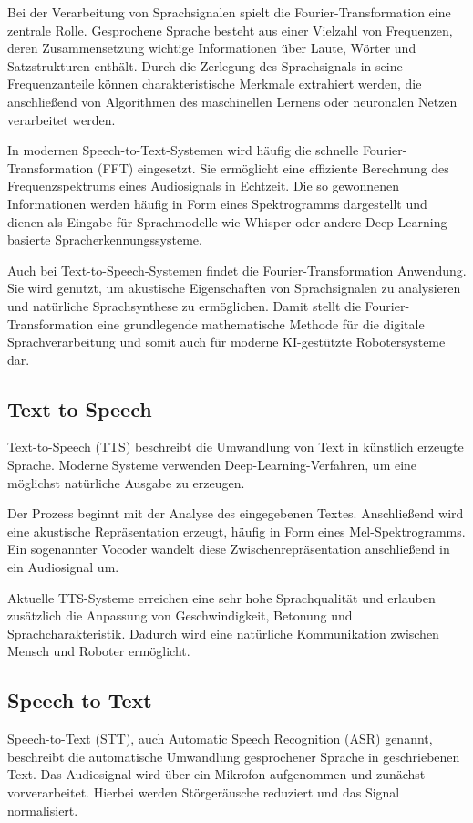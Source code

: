 Bei der Verarbeitung von Sprachsignalen spielt die Fourier-Transformation eine zentrale Rolle. Gesprochene Sprache besteht aus einer Vielzahl von Frequenzen, deren Zusammensetzung wichtige Informationen über Laute, Wörter und Satzstrukturen enthält. Durch die Zerlegung des Sprachsignals in seine Frequenzanteile können charakteristische Merkmale extrahiert werden, die anschließend von Algorithmen des maschinellen Lernens oder neuronalen Netzen verarbeitet werden. 


In modernen Speech-to-Text-Systemen wird häufig die schnelle Fourier-Transformation (FFT) eingesetzt. Sie ermöglicht eine effiziente Berechnung des Frequenzspektrums eines Audiosignals in Echtzeit. Die so gewonnenen Informationen werden häufig in Form eines Spektrogramms dargestellt und dienen als Eingabe für Sprachmodelle wie Whisper oder andere Deep-Learning-basierte Spracherkennungssysteme.\cite{radford2022whisper}


Auch bei Text-to-Speech-Systemen findet die Fourier-Transformation Anwendung. Sie wird genutzt, um akustische Eigenschaften von Sprachsignalen zu analysieren und natürliche Sprachsynthese zu ermöglichen. Damit stellt die Fourier-Transformation eine grundlegende mathematische Methode für die digitale Sprachverarbeitung und somit auch für moderne KI-gestützte Robotersysteme dar.

 
\subsection{Text to Speech} %
Text-to-Speech (TTS) beschreibt die Umwandlung von Text in künstlich erzeugte Sprache. Moderne Systeme verwenden Deep-Learning-Verfahren, um eine möglichst natürliche Ausgabe zu erzeugen. 

Der Prozess beginnt mit der Analyse des eingegebenen Textes. Anschließend wird eine akustische Repräsentation erzeugt, häufig in Form eines Mel-Spektrogramms. Ein sogenannter Vocoder wandelt diese Zwischenrepräsentation anschließend in ein Audiosignal um. \cite{shen2018tacotron}

Aktuelle TTS-Systeme erreichen eine sehr hohe Sprachqualität und erlauben zusätzlich die Anpassung von Geschwindigkeit, Betonung und Sprachcharakteristik. Dadurch wird eine natürliche Kommunikation zwischen Mensch und Roboter ermöglicht. \cite{shen2018tacotron} 

\subsection{Speech to Text}
Speech-to-Text (STT), auch Automatic Speech Recognition (ASR) genannt, beschreibt die automatische Umwandlung gesprochener Sprache in geschriebenen Text. Das Audiosignal wird über ein Mikrofon aufgenommen und zunächst vorverarbeitet. Hierbei werden Störgeräusche reduziert und das Signal normalisiert. \cite{radford2022whisper}

